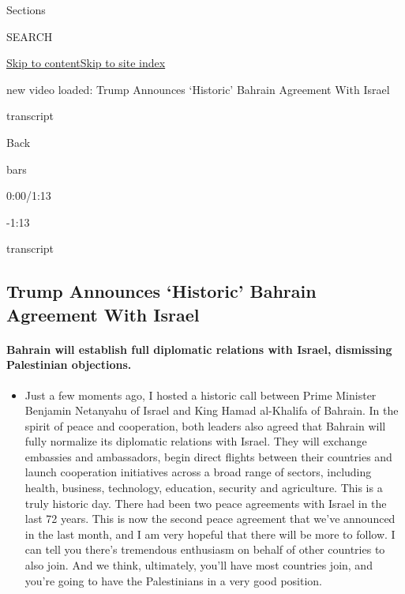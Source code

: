 Sections

SEARCH

\protect\hyperlink{site-content}{Skip to
content}\protect\hyperlink{site-index}{Skip to site index}

new video loaded: Trump Announces `Historic' Bahrain Agreement With
Israel

transcript

Back

bars

0:00/1:13

-1:13

transcript

\hypertarget{trump-announces-historic-bahrain-agreement-with-israel}{%
\subsection{Trump Announces `Historic' Bahrain Agreement With
Israel}\label{trump-announces-historic-bahrain-agreement-with-israel}}

\hypertarget{bahrain-will-establish-full-diplomatic-relations-with-israel-dismissing-palestinian-objections}{%
\paragraph{Bahrain will establish full diplomatic relations with Israel,
dismissing Palestinian
objections.}\label{bahrain-will-establish-full-diplomatic-relations-with-israel-dismissing-palestinian-objections}}

\begin{itemize}
\tightlist
\item
  Just a few moments ago, I hosted a historic call between Prime
  Minister Benjamin Netanyahu of Israel and King Hamad al-Khalifa of
  Bahrain. In the spirit of peace and cooperation, both leaders also
  agreed that Bahrain will fully normalize its diplomatic relations with
  Israel. They will exchange embassies and ambassadors, begin direct
  flights between their countries and launch cooperation initiatives
  across a broad range of sectors, including health, business,
  technology, education, security and agriculture. This is a truly
  historic day. There had been two peace agreements with Israel in the
  last 72 years. This is now the second peace agreement that we've
  announced in the last month, and I am very hopeful that there will be
  more to follow. I can tell you there's tremendous enthusiasm on behalf
  of other countries to also join. And we think, ultimately, you'll have
  most countries join, and you're going to have the Palestinians in a
  very good position.
\end{itemize}

